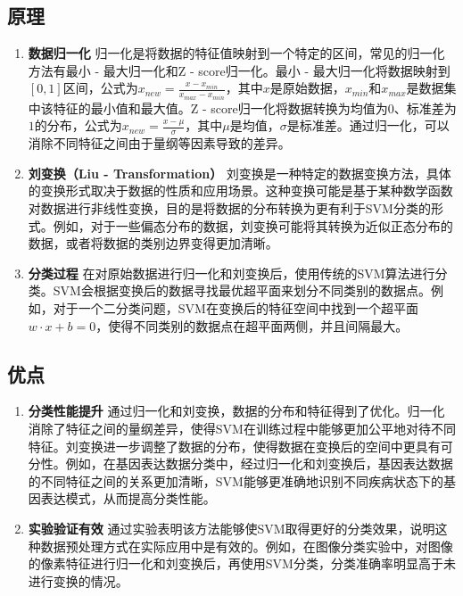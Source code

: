 \documentclass[12pt]{article}
\begin{document}
\subsection{原理}
\begin{enumerate}
    \item \textbf{数据归一化}
    归一化是将数据的特征值映射到一个特定的区间，常见的归一化方法有最小 - 最大归一化和Z - score归一化。最小 - 最大归一化将数据映射到\([0,1]\)区间，公式为\(x_{new}=\frac{x - x_{min}}{x_{max}-x_{min}}\)，其中\(x\)是原始数据，\(x_{min}\)和\(x_{max}\)是数据集中该特征的最小值和最大值。Z - score归一化将数据转换为均值为\(0\)、标准差为\(1\)的分布，公式为\(x_{new}=\frac{x - \mu}{\sigma}\)，其中\(\mu\)是均值，\(\sigma\)是标准差。通过归一化，可以消除不同特征之间由于量纲等因素导致的差异。
    \item \textbf{刘变换（Liu - Transformation）}
    刘变换是一种特定的数据变换方法，具体的变换形式取决于数据的性质和应用场景。这种变换可能是基于某种数学函数对数据进行非线性变换，目的是将数据的分布转换为更有利于SVM分类的形式。例如，对于一些偏态分布的数据，刘变换可能将其转换为近似正态分布的数据，或者将数据的类别边界变得更加清晰。
    \item \textbf{分类过程}
    在对原始数据进行归一化和刘变换后，使用传统的SVM算法进行分类。SVM会根据变换后的数据寻找最优超平面来划分不同类别的数据点。例如，对于一个二分类问题，SVM在变换后的特征空间中找到一个超平面\(w\cdot x + b = 0\)，使得不同类别的数据点在超平面两侧，并且间隔最大。
\end{enumerate}

\subsection{优点}
\begin{enumerate}
    \item \textbf{分类性能提升}
    通过归一化和刘变换，数据的分布和特征得到了优化。归一化消除了特征之间的量纲差异，使得SVM在训练过程中能够更加公平地对待不同特征。刘变换进一步调整了数据的分布，使得数据在变换后的空间中更具有可分性。例如，在基因表达数据分类中，经过归一化和刘变换后，基因表达数据的不同特征之间的关系更加清晰，SVM能够更准确地识别不同疾病状态下的基因表达模式，从而提高分类性能。
    \item \textbf{实验验证有效}
    通过实验表明该方法能够使SVM取得更好的分类效果，说明这种数据预处理方式在实际应用中是有效的。例如，在图像分类实验中，对图像的像素特征进行归一化和刘变换后，再使用SVM分类，分类准确率明显高于未进行变换的情况。
\end{enumerate}
\end{document}
